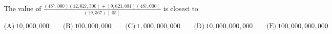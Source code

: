 

The value of $\frac{(487,000)(12,027,300)+(9,621,001)(487,000)}{(19,367)(.05)}$ is closest to

$\text{(A)}\ 10,000,000 \qquad \text{(B)}\ 100,000,000 \qquad \text{(C)}\ 1,000,000,000 \qquad \text{(D)}\ 10,000,000,000 \qquad \text{(E)}\ 100,000,000,000$
